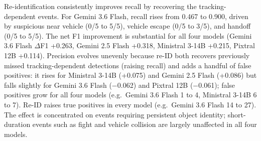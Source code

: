 \begin{table}[h]
  \centering
  \caption{Re-identification ablation: all four VLM models on 30 scenes, with and without re-ID.}
  \label{tab:reid_ablation}
\end{table}

Re-identification consistently improves recall by recovering the tracking-dependent events. For Gemini 3.6 Flash, recall rises from 0.467 to 0.900, driven by suspicious near vehicle (0/5 to 5/5), vehicle escape (0/5 to 3/5), and handoff (0/5 to 5/5). The net F1 improvement is substantial for all four models (Gemini 3.6 Flash $\Delta$F1 +0.263, Gemini 2.5 Flash +0.318, Ministral 3-14B +0.215, Pixtral 12B +0.114). Precision evolves unevenly because re-ID both recovers previously missed tracking-dependent detections (raising recall) and adds a handful of false positives: it rises for Ministral 3-14B (+0.075) and Gemini 2.5 Flash (+0.086) but falls slightly for Gemini 3.6 Flash ($-$0.062) and Pixtral 12B ($-$0.061); false positives grow for all four models (e.g.\ Gemini 3.6 Flash 1 to 4, Ministral 3-14B 6 to 7). Re-ID raises true positives in every model (e.g.\ Gemini 3.6 Flash 14 to 27). The effect is concentrated on events requiring persistent object identity; short-duration events such as fight and vehicle collision are largely unaffected in all four models.

